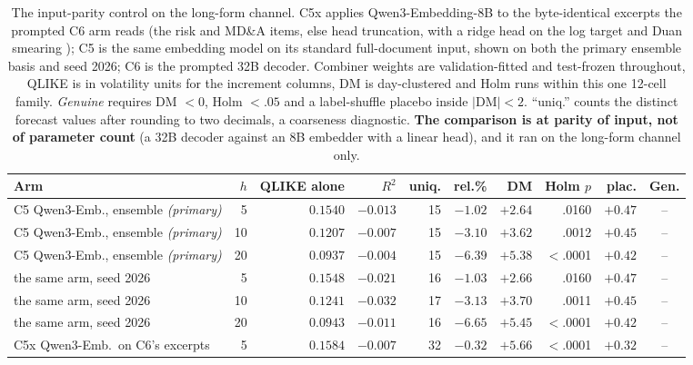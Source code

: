 \begin{table}[htbp]
\centering
\caption[Input parity: prompting against same-lineage pooling]{The
input-parity control on the long-form channel. C5x applies
Qwen3-Embedding-8B to the byte-identical excerpts the prompted C6 arm reads
(the risk and MD\&A items, else head truncation, with a ridge head on the
log target and Duan smearing \cite{duan1983smearing}); C5 is the same embedding model on its
standard full-document input, shown on both the primary ensemble basis and
seed 2026; C6 is the prompted 32B decoder. Combiner weights are
validation-fitted and test-frozen throughout, QLIKE is in volatility units
for the increment columns, DM is day-clustered and Holm runs within this
one 12-cell family. \emph{Genuine} requires DM $<0$, Holm $<.05$ and a
label-shuffle placebo inside $|\mathrm{DM}|<2$. ``uniq.'' counts the
distinct forecast values after rounding to two decimals, a coarseness
diagnostic. \textbf{The comparison is at parity of input, not of parameter
count} (a 32B decoder against an 8B embedder with a linear head), and
it ran on the long-form channel only.}
\label{tab:app-c5x}
\singlespacing\footnotesize
\setlength{\tabcolsep}{3.5pt}
\begin{tabular}{@{}lrrrrrrrrc@{}}
\toprule
Arm & $h$ & QLIKE alone & $R^2$ & uniq. & rel.\% & DM & Holm $p$ & plac. & Gen. \\
\midrule
C5 Qwen3-Emb., ensemble \emph{(primary)} & 5 & $0.1540$ & $-0.013$ & 15 & $-1.02$ & $+2.64$ & .0160 & $+0.47$ & -- \\
C5 Qwen3-Emb., ensemble \emph{(primary)} & 10 & $0.1207$ & $-0.007$ & 15 & $-3.10$ & $+3.62$ & .0012 & $+0.45$ & -- \\
C5 Qwen3-Emb., ensemble \emph{(primary)} & 20 & $0.0937$ & $-0.004$ & 15 & $-6.39$ & $+5.38$ & $<$.0001 & $+0.42$ & -- \\
\addlinespace
\quad the same arm, seed 2026 & 5 & $0.1548$ & $-0.021$ & 16 & $-1.03$ & $+2.66$ & .0160 & $+0.47$ & -- \\
\quad the same arm, seed 2026 & 10 & $0.1241$ & $-0.032$ & 17 & $-3.13$ & $+3.70$ & .0011 & $+0.45$ & -- \\
\quad the same arm, seed 2026 & 20 & $0.0943$ & $-0.011$ & 16 & $-6.65$ & $+5.45$ & $<$.0001 & $+0.42$ & -- \\
\addlinespace
C5x Qwen3-Emb.\ on C6's excerpts & 5 & $0.1584$ & $-0.007$ & 32 & $-0.32$ & $+5.66$ & $<$.0001 & $+0.32$ & -- \\

\end{tabular}
\end{table}
